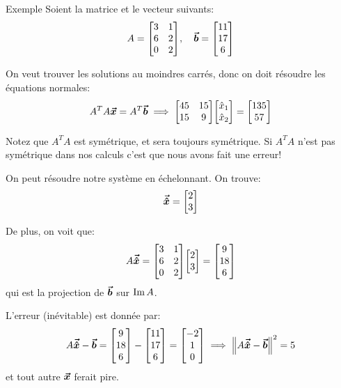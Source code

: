 \documentclass[a4paper]{article}
\begin{document}
\begin{parag}{Exemple}
    Soient la matrice et le vecteur suivants:
    \[A = \begin{bmatrix} 3 & 1 \\ 6 & 2 \\ 0 & 2 \end{bmatrix}, \mathspace \bvec{b} = \begin{bmatrix} 11 \\ 17 \\ 6 \end{bmatrix} \]

    On veut trouver les solutions au moindres carrés, donc on doit résoudre les équations normales:
    \[A^T A \bvec{x} = A^T \bvec{b} \implies \begin{bmatrix} 45 & 15 \\ 15 & 9 \end{bmatrix} \begin{bmatrix} \hat{x}_1 \\ \hat{x}_2 \end{bmatrix} = \begin{bmatrix} 135 \\ 57 \end{bmatrix} \]

    Notez que $A^T A$ est symétrique, et sera toujours symétrique. Si $A^T A$ n'est pas symétrique dans nos calculs c'est que nous avons fait une erreur!

    On peut résoudre notre système en échelonnant. On trouve:
    \[\bm{\protect\vec{\hat{x}}} = \begin{bmatrix} 2 \\ 3 \end{bmatrix} \]

    De plus, on voit que:
    \[A \bvec{\hat{x}} = \begin{bmatrix} 3 & 1 \\ 6 & 2 \\ 0 & 2 \end{bmatrix} \begin{bmatrix} 2 \\ 3 \end{bmatrix} = \begin{bmatrix} 9 \\ 18 \\ 6 \end{bmatrix} \]
    qui est la projection de $\bm{\protect\vec{b}}$ sur $\operatorname{Im} A$.

    L'erreur (inévitable) est donnée par:
    \[A \bvec{\hat{x}} - \bvec{b} = \begin{bmatrix} 9 \\ 18 \\ 6 \end{bmatrix} - \begin{bmatrix} 11 \\ 17 \\ 6 \end{bmatrix} = \begin{bmatrix} -2 \\ 1 \\ 0 \end{bmatrix} \implies \left\|A \bvec{\hat{x}} - \bvec{b}\right\|^2 = 5\]
    et tout autre $\bm{\protect\vec{x}}$ ferait pire.
\end{parag}
\end{document}
